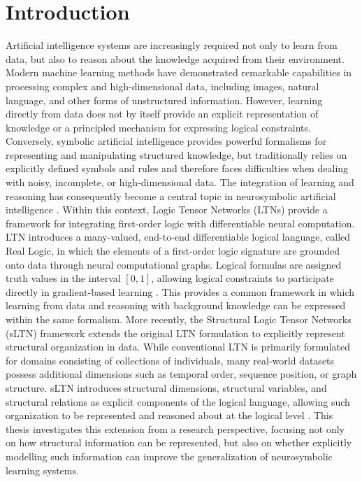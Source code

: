 \chapter{Introduction}

\label{chap:intro}

\noindent
Artificial intelligence systems are increasingly required not only to learn from data, but also to reason about the knowledge acquired from their environment. Modern machine learning methods have demonstrated remarkable capabilities in processing complex and high-dimensional data, including images, natural language, and other forms of unstructured information. However, learning directly from data does not by itself provide an explicit representation of knowledge or a principled mechanism for expressing logical constraints. Conversely, symbolic artificial intelligence provides powerful formalisms for representing and manipulating structured knowledge, but traditionally relies on explicitly defined symbols and rules and therefore faces difficulties when dealing with noisy, incomplete, or high-dimensional data. The integration of learning and reasoning has consequently become a central topic in neurosymbolic artificial intelligence \cite{badreddine2022logic}.
Within this context, Logic Tensor Networks (LTNs) provide a framework for integrating first-order logic with differentiable neural computation. LTN introduces a many-valued, end-to-end differentiable logical language, called Real Logic, in which the elements of a first-order logic signature are grounded onto data through neural computational graphs. Logical formulas are assigned truth values in the interval $[0,1]$, allowing logical constraints to participate directly in gradient-based learning \cite{badreddine2022logic}. This provides a common framework in which learning from data and reasoning with background knowledge can be expressed within the same formalism.
More recently, the Structural Logic Tensor Networks (sLTN) framework extends the original LTN formulation to explicitly represent structural organization in data. While conventional LTN is primarily formulated for domains consisting of collections of individuals, many real-world datasets possess additional dimensions such as temporal order, sequence position, or graph structure. sLTN introduces structural dimensions, structural variables, and structural relations as explicit components of the logical language, allowing such organization to be represented and reasoned about at the logical level \cite{rinaldi2026sltn}. This thesis investigates this extension from a research perspective, focusing not only on how structural information can be represented, but also on whether explicitly modelling such information can improve the generalization of neurosymbolic learning systems.

